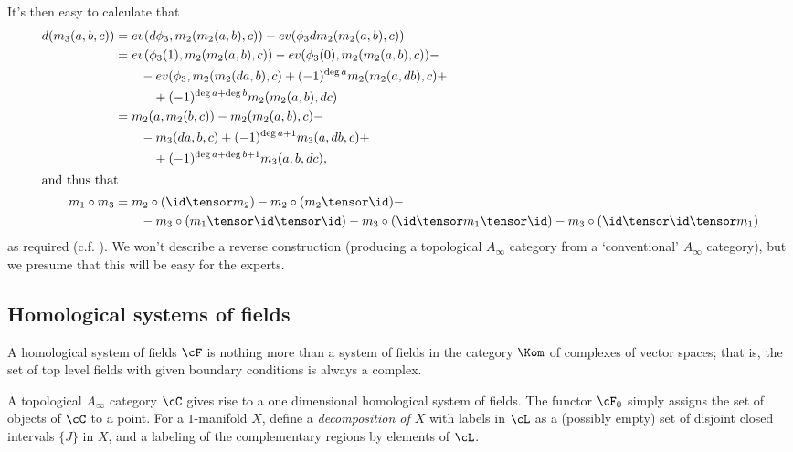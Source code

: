 It's then easy to calculate that
\begin{align*}
d(m_3(a,b,c)) & = ev(d \phi_3, m_2(m_2(a,b),c)) - ev(\phi_3 d m_2(m_2(a,b), c)) \\
 & = ev( \phi_3(1), m_2(m_2(a,b),c)) - ev(\phi_3(0), m_2 (m_2(a,b),c)) - \\ & \qquad - ev(\phi_3, m_2(m_2(da, b), c) + (-1)^{\deg a} m_2(m_2(a, db), c) + \\ & \qquad \quad + (-1)^{\deg a+\deg b} m_2(m_2(a, b), dc) \\
 & = m_2(a , m_2(b,c)) - m_2(m_2(a,b),c) - \\ & \qquad - m_3(da,b,c) + (-1)^{\deg a + 1} m_3(a,db,c) + \\ & \qquad \quad + (-1)^{\deg a + \deg b + 1} m_3(a,b,dc), \\
\intertext{and thus that}
m_1 \circ m_3 & =  m_2 \circ (\id \tensor m_2) - m_2 \circ (m_2 \tensor \id) - \\ & \qquad - m_3 \circ (m_1 \tensor \id \tensor \id) - m_3 \circ (\id \tensor m_1 \tensor \id) - m_3 \circ (\id \tensor \id \tensor m_1)
\end{align*}
as required (c.f. \cite[p. 6]{MR1854636}).
We won't describe a reverse construction (producing a topological $A_\infty$ category from a `conventional' $A_\infty$ category), but we presume that this will be easy for the experts.

\subsection{Homological systems of fields}
A homological system of fields $\cF$ is nothing more than a system of fields in the category $\Kom$ of complexes of vector spaces; that is, the set of top level fields with given boundary conditions is always a complex.

A topological $A_\infty$ category $\cC$ gives rise to a one dimensional homological system of fields. The functor $\cF_0$ simply assigns the set of objects of $\cC$ to a point. 
For a $1$-manifold $X$, define a \emph{decomposition of $X$} with labels in $\cL$ as a (possibly empty) set of disjoint closed intervals $\{J\}$ in $X$, and a labeling of the complementary regions by elements of $\cL$.

